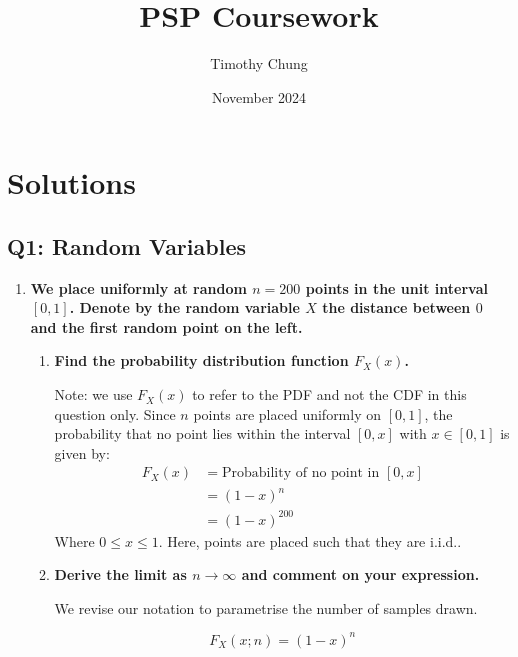 \documentclass[a4paper, 8pt]{article}
\title{PSP Coursework}
\author{Timothy Chung}
\date{November 2024}
\begin{document}
\maketitle

\section*{Solutions}
\RaggedRight %



\subsection*{Q1: Random Variables}

\begin{enumerate}[label=\alph*)]
    \item \textbf{We place uniformly at random $n = 200$ points in the unit interval $[0, 1]$. Denote by the random variable $X$ the distance between $0$ and the first random point on the left.}

          \begin{enumerate}[label=\roman*)]
              \item \textbf{Find the probability distribution function $F_X(x)$.}

                    Note: we use $F_X(x)$ to refer to the PDF and not the CDF in this question only. Since $n$ points are placed uniformly on $[0, 1]$, the probability that no point lies within the interval $[0, x]$ with $x \in [0, 1]$ is given by:
                    \begin{align*}
                        F_X(x) & = \text{Probability of no point in } [0, x] \\
                               & = (1 - x)^n                                 \\
                               & = (1-x)^{200}
                    \end{align*}
                    Where $ 0 \leq x \leq 1$. Here, points are placed such that they are i.i.d..

              \item \textbf{Derive the limit as $n \to \infty$ and comment on your expression.}

                    We revise our notation to parametrise the number of samples drawn.

                    \[
                        F_X(x;n) = (1 - x)^n
                    \]


\end{enumerate}
\end{enumerate}
\end{document}
